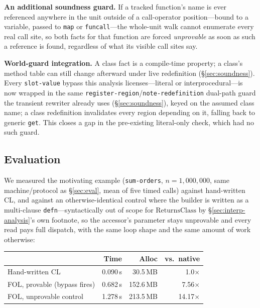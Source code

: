 \documentclass[sigplan,review,anonymous]{acmart}
\begin{document}
\textbf{An additional soundness guard.} If a tracked function's name is ever referenced anywhere in the unit outside of a call-operator position---bound to a variable, passed to \texttt{map} or \texttt{funcall}---the whole-unit walk cannot enumerate every real call site, so both facts for that function are forced \emph{unprovable} as soon as such a reference is found, regardless of what its visible call sites say.

\textbf{World-guard integration.} A class fact is a compile-time property; a class's method table can still change afterward under live redefinition (§\ref{sec:soundness}). Every \texttt{slot-value} bypass this analysis licenses---literal or interprocedural---is now wrapped in the same \texttt{register-region}/\texttt{note-redefinition} dual-path guard the transient rewriter already uses (§\ref{sec:soundness}), keyed on the assumed class name; a class redefinition invalidates every region depending on it, falling back to generic \texttt{get}. This closes a gap in the pre-existing literal-only check, which had no such guard.

\subsection{Evaluation}
\label{sec:interp-eval}

We measured the motivating example (\texttt{sum-orders}, $n=1{,}000{,}000$, same machine/protocol as §\ref{sec:eval}, mean of five timed calls) against hand-written CL, and against an otherwise-identical control where the builder is written as a multi-clause \texttt{defn}---syntactically out of scope for $\mathrm{ReturnsClass}$ by \S\ref{sec:interp-analysis}'s own footnote, so the accessor's parameter stays unprovable and every read pays full dispatch, with the same loop shape and the same amount of work otherwise:

\begin{center}
\footnotesize
\begin{tabular}{@{}lrrr@{}}
\toprule
 & Time & Alloc & vs.\ native \\
\midrule
Hand-written CL & 0.090\,s & 30.5\,MB & 1.0$\times$ \\
FOL, provable (bypass fires) & 0.682\,s & 152.6\,MB & 7.56$\times$ \\
FOL, unprovable control & 1.278\,s & 213.5\,MB & 14.17$\times$ \\
\bottomrule
\end{tabular}
\end{center}
\end{document}
